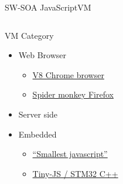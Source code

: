 %
\begin{Frame}{SW-SOA JavaScriptVM}
  \begin{columns}[t]
    \begin{column}{5cm} %
      \begin{block}{VM Category}
        \begin{itemize}
        \item Web Browser
          \begin{itemize}
          \item
            \href{https://en.wikipedia.org/wiki/V8_(JavaScript_engine)}{V8
              Chrome browser}
          \item
            \href{https://en.wikipedia.org/wiki/SpiderMonkey_(JavaScript_engine)}{Spider
            monkey Firefox}
          \end{itemize}
        \item Server side
        \item Embedded
          \begin{itemize}
          \item \href{https://github.com/cesanta/v7/}{``Smallest javascript''}
          \item \href{https://github.com/snoozbuster/tiny-js}{Tiny-JS
              / STM32 C++}
          \end{itemize}
        \end{itemize}
      \end{block} 
    \end{column}
    
    \begin{column}{5cm} %
      \begin{block}{}
      \end{block}   
    \end{column}
  \end{columns}  
\end{Frame}



